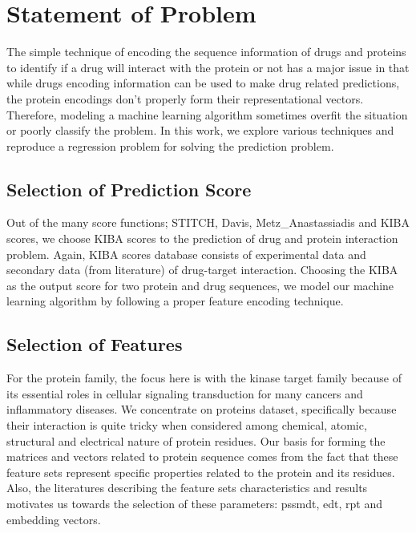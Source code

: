 \iffalse

For citations, use the function \textbackslash cite. \cite{gowar1989power} The references file is the sample.bib one. Google Scholar provides almost all the references in LaTeX form.

To insert a footnote, use the following command. \footnote{This is a footnote.} When necessary to use a nomenclature, define it on the same page for a better organization. Don't create NSN (Non-sense nomenclatures).

For figures, tables, equations and further information, open the file "tips.tex". If what you need is not found there, Google it.

\fi

\section{Statement of Problem}
The simple technique of encoding the sequence information of drugs and proteins to identify if a drug will interact with the protein or not has a major issue in that while drugs encoding information can be used to make drug related predictions, the protein encodings don't properly form their representational vectors. Therefore, modeling a machine learning algorithm sometimes overfit the situation or poorly classify the problem. In this work, we explore various techniques and reproduce a regression problem for solving the prediction problem.

\subsection{Selection of Prediction Score}

Out of the many score functions; STITCH, Davis, Metz\_Anastassiadis and KIBA scores, we choose KIBA scores to the prediction of drug and protein interaction problem. Again, KIBA scores database consists of experimental data and secondary data (from literature) of drug-target interaction. Choosing the KIBA as the output score for two protein and drug sequences, we model our machine learning algorithm by following a proper feature encoding technique.

\subsection{Selection of Features}

For the protein family, the focus here is with the kinase target family because of its essential roles in cellular signaling transduction for many cancers and inflammatory diseases. We concentrate on proteins dataset, specifically because their interaction is quite tricky when considered among chemical, atomic, structural and electrical nature of protein residues. Our basis for forming the matrices and vectors related to protein sequence comes from the fact that these feature sets represent specific properties related to the protein and its residues. Also, the literatures describing the feature sets characteristics and results motivates us towards the selection of these parameters: \acrshort{pssmdt}, \acrshort{edt}, \acrshort{rpt} and embedding vectors.


